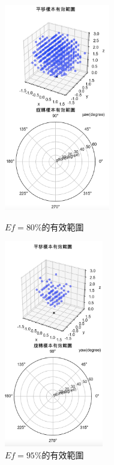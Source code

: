 \begin{figure}[htpb]
    \centering
    \begin{minipage}{.5\textwidth}
        \centering
        \includegraphics[height = 9cm]{ch4pic/ef80.png}
        \caption{$Ef=80\%$的有效範圍}
        \label{pic:ef80}
    \end{minipage}%
    \begin{minipage}{0.5\textwidth}
        \centering
        \includegraphics[height = 9cm]{ch4pic/ef95.png}
        \caption{$Ef=95\%$的有效範圍}
        \label{pic:ef95}
    \end{minipage}
\end{figure}



